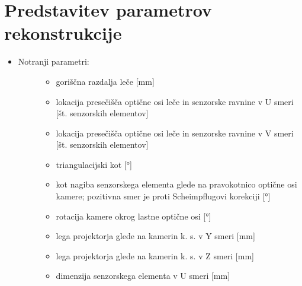 \documentclass[letterpaper,10pt,english]{sphinxmanual}
\begin{document}
\section{Predstavitev parametrov rekonstrukcije}
\label{\detokenize{kalibracija:predstavitev-parametrov-rekonstrukcije}}\begin{itemize}
\item {} \begin{description}
\item[{Notranji parametri:}] \leavevmode\begin{itemize}
\item {} 
\sphinxAtStartPar
{}              goriščna razdalja leče  {[}mm{]}

\item {} 
\sphinxAtStartPar
{}             lokacija presečišča optične osi leče in senzorske ravnine v U smeri                                                             {[}št. senzorskih elementov{]}

\item {} 
\sphinxAtStartPar
{}             lokacija presečišča optične osi leče in senzorske ravnine v V smeri                                                             {[}št. senzorskih elementov{]}

\item {} 
\sphinxAtStartPar
{}   triangulacijski kot                                     {[}°{]}

\item {} 
\sphinxAtStartPar
{}   kot nagiba senzorskega elementa glede na pravokotnico optične osi kamere; pozitivna smer je proti Scheimpflugovi korekciji                      {[}°{]}

\item {} 
\sphinxAtStartPar
{}            rotacija kamere okrog lastne optične osi                {[}°{]}

\item {} 
\sphinxAtStartPar
{}             lega projektorja glede na kamerin k. s. v Y smeri       {[}mm{]}

\item {} 
\sphinxAtStartPar
{}             lega projektorja glede na kamerin k. s. v Z smeri       {[}mm{]}

\item {} 
\sphinxAtStartPar
{}             dimenzija senzorskega elementa v U smeri                {[}mm{]}


\end{itemize}
\end{description}
\end{itemize}
\end{document}
